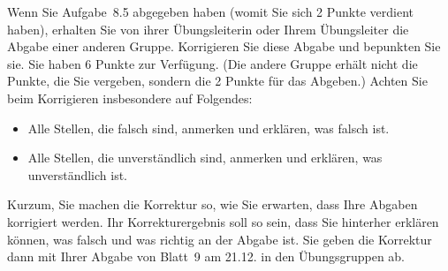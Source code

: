 \bigskip

\begin{aufg}
Wenn Sie Aufgabe~8.5 abgegeben haben (womit Sie sich 2 Punkte verdient haben), erhalten Sie von ihrer \"Ubungsleiterin oder Ihrem \"Ubungsleiter die Abgabe einer anderen Gruppe. Korrigieren Sie diese Abgabe und bepunkten Sie sie. Sie haben 6 Punkte zur Verf\"ugung. (Die andere Gruppe erh\"alt nicht die Punkte, die Sie vergeben, sondern die 2 Punkte f\"ur das Abgeben.) Achten Sie beim Korrigieren insbesondere auf Folgendes: 
\begin{itemize}
 \item Alle Stellen, die falsch sind, anmerken und erkl\"aren, was falsch ist.
 \item Alle Stellen, die unverst\"andlich sind, anmerken und erkl\"aren, was unverst\"andlich ist.
\end{itemize}
Kurzum, Sie machen die Korrektur so, wie Sie erwarten, dass Ihre Abgaben korrigiert werden. Ihr Korrekturergebnis soll so sein, dass Sie hinterher erkl\"aren k\"onnen, was falsch und was richtig an der Abgabe ist. Sie geben die Korrektur dann mit Ihrer Abgabe von Blatt~9 am 21.12. in den \"Ubungsgruppen ab.
\end{aufg}

